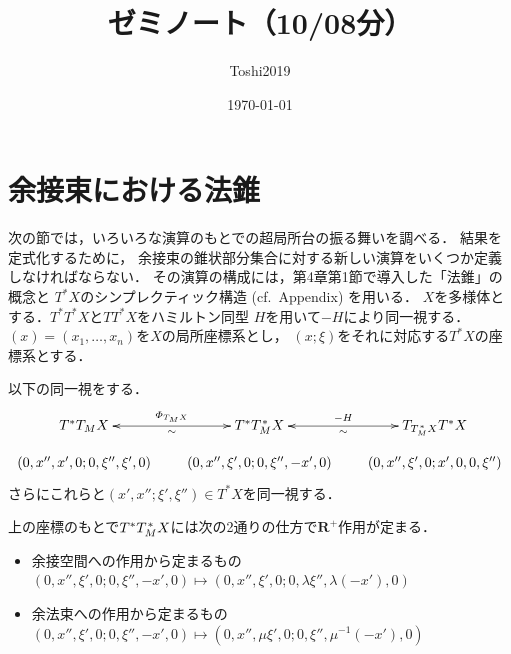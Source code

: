 \documentclass[leqno, 10pt, a4paper, dvipdfmx]{jsarticle}
\title{ゼミノート（10/08分）}
\author{Toshi2019}
\date{\today}
\theoremstyle{definition}
\newcommand{\rr}{\mathbf{R}}
\numberwithin{equation}{section}
\newcommand{\rrp}{\rr^{+}} %
\theoremstyle{mystyle}
\newcommand{\cotb}[1][]{T^{\ast}{#1}}
\newcommand{\conm}[2][]{T_{#1}^{\hspace{0.7pt}\ast}{#2}}
\newcommand{\norb}[2][]{T_{#1}{#2}}
\begin{document}
\maketitle
\section{余接束における法錐}
次の節では，いろいろな演算のもとでの超局所台の振る舞いを調べる．
結果を定式化するために，
余接束の錐状部分集合に対する新しい演算をいくつか定義しなければならない．
その演算の構成には，第4章第1節で導入した「法錐」の概念と
\(\cotb[X]\)のシンプレクティック構造 (cf.~Appendix) を用いる．
\(X\)を多様体とする．\(\cotb[{\cotb[X]}]\)と\(T\cotb[X]\)をハミルトン同型
\(H\)を用いて\(-H\)により同一視する．
\((x)=(x_1,\dots,x_n)\)を\(X\)の局所座標系とし，
\((x;\xi)\)をそれに対応する\(\cotb[X]\)の座標系とする．



以下の同一視をする．
\[\xymatrix@C=20pt@R=10pt
{
    \cotb[{\norb[M]{X}}]
        \ar@{<->}[r]^-{\varPhi_{\norb[M]{X}}}_-{\sim}
    &
    \cotb[{\conm[M]{X}}]
        \ar@{<->}[r]^-{-H}_-{\sim}
    &
    \norb[{\conm[M]{X}}]{\cotb[X]}\\
    (0,x'',x',0;0,\xi'',\xi',0)
    &
    (0,x'',\xi',0;0,\xi'',-x',0)
    &
    (0,x'',\xi',0;x',0,0,\xi'')
}\]
さらにこれらと\((x',x'';\xi',\xi'')\in \cotb[X]\)を同一視する．

上の座標のもとで\(\cotb[{\conm[M]{X}}]\)には次の2通りの仕方で\(\rrp\)作用が定まる．
\begin{itemize}
    \item 余接空間への作用から定まるもの \((0,x'',\xi',0;0,\xi'',-x',0)\mapsto (0,x'',\xi',0;0,\lambda\xi'',\lambda(-x'),0)\)
    \item 余法束への作用から定まるもの \((0,x'',\xi',0;0,\xi'',-x',0)\mapsto (0,x'',\mu\xi',0;0,\xi'',\mu^{-1}(-x'),0)\)
\end{itemize}
\end{document}
